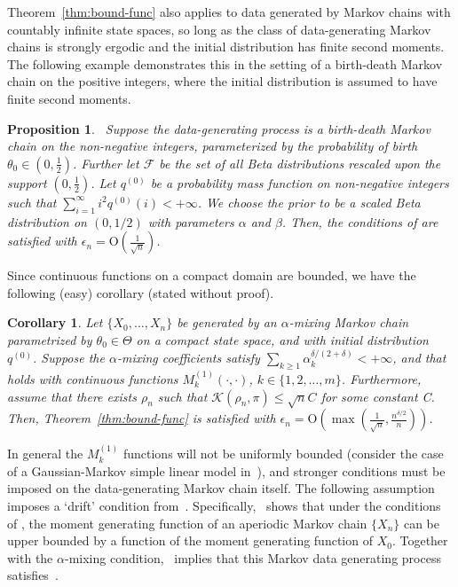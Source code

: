 \documentclass[11pt]{amsart}
\newcommand{\data}{X_0,\dots,X_n}
\newtheorem{corollary}{Corollary}[section]
\newtheorem{proposition}{Proposition}[section]
\begin{document}
 Theorem~\ref{thm:bound-func} also applies to data generated by Markov chains with countably infinite state spaces, so long as the class of data-generating Markov chains is strongly ergodic and the initial distribution has finite second moments. The following example demonstrates this in the setting of a birth-death Markov chain on the positive integers, where the initial distribution is assumed to have finite second moments.
 
\begin{proposition}~\label{thm:bd2-ns}
Suppose the data-generating process is a birth-death Markov chain on the non-negative integers, parameterized by the probability of birth $\theta_0\in(0,\frac{1}{2})$. Further let $\mathcal{F}$ be the set of all Beta distributions rescaled upon the support $(0,\frac{1}{2})$. Let $q^{(0)}$ be a probability mass function on non-negative integers such that $\sum_{i=1}^{\infty} i^2 q^{(0)}(i) < +\infty$. We choose the prior to be a scaled Beta distribution on $(0,1/2)$ with parameters $\alpha$ and $\beta$. Then, the conditions of  are satisfied with $\epsilon_n=\mathrm{O}\left(\frac{1}{\sqrt{n}}\right)$.
\end{proposition}

Since continuous functions on a compact domain are bounded, we have the following (easy) corollary (stated without proof).

\begin{corollary}\label{cor:bound-ss}
  Let $\{\data\}$ be generated by an $\alpha$-mixing Markov chain parametrized by $\theta_0 \in \Theta$ on a compact state space, and with initial distribution $q^{(0)}$. Suppose the $\alpha$-mixing coefficients satisfy $\sum_{k\geq 1} \alpha_k^{{\delta}/{(2+\delta)}} < +\infty$, and that~ holds with continuous functions $M^{(1)}_k(\cdot,\cdot)$, $k \in \{1,2,\dots,m\}$.  Furthermore, assume that {there exists $\rho_n$ such that} $\mathcal{K}(\rho_n,\pi)\leq \sqrt{n}C$ for some constant C. Then, Theorem~\ref{thm:bound-func} is satisfied with $\epsilon_n=\mathrm{O}\left(\max(\frac{1}{\sqrt{n}},\frac{n^{\delta/2}}{n})\right)$.
\end{corollary}

In general the $M^{(1)}_k$ functions will not be uniformly bounded (consider the case of a Gaussian-Markov simple linear model in~), and stronger conditions must be imposed on the data-generating Markov chain itself. The following assumption imposes a `drift' condition from~\cite{hajek}. Specifically,~\cite[Theorem 2.3]{hajek} shows that under the conditions of , the moment generating function of an aperiodic Markov chain $\{X_n\}$ can be upper bounded by a function of the moment generating function of $X_0$. Together with the $\alpha$-mixing condition,~ implies that this Markov data generating process satisfies~.
\end{document}
